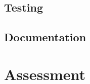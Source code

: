 \documentclass[titlepage]{article}
\begin{document}
\subsection{Testing}

\subsection{Documentation}

\section{Assessment}



\end{document}
